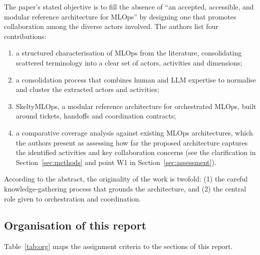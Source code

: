 \documentclass[11pt,a4paper]{article}
\begin{document}
The paper's stated objective is to fill the absence of ``an accepted, accessible, and modular reference architecture for MLOps'' by designing one that promotes collaboration among the diverse actors involved. The authors list four contributions:
\begin{enumerate}[label=\textbf{C\arabic*.}]
  \item a structured characterisation of MLOps from the literature, consolidating scattered terminology into a clear set of actors, activities and dimensions;
  \item a consolidation process that combines human and LLM expertise to normalise and cluster the extracted actors and activities;
  \item SkeltyMLOps, a modular reference architecture for orchestrated MLOps, built around tickets, handoffs and coordination contracts;
  \item a comparative coverage analysis against existing MLOps architectures, which the authors present as assessing how far the proposed architecture captures the identified activities and key collaboration concerns (see the clarification in Section~\ref{sec:methods} and point W1 in Section~\ref{sec:assessment}).
\end{enumerate}
According to the abstract, the originality of the work is twofold: (1) the careful knowledge-gathering process that grounds the architecture, and (2) the central role given to orchestration and coordination.

\subsection{Organisation of this report}

Table~\ref{tab:org} maps the assignment criteria to the sections of this report.
\end{document}
